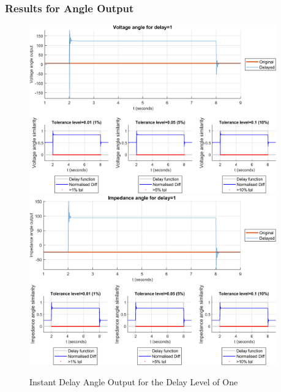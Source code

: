 \subsubsection{Results for Angle Output}
\begin{figure}
    \caption{Instant Delay Angle Output for the Delay Level of One}
    \includegraphics[width=0.95\textwidth]{PMUsim-figures/DelayOf_1/Instant_vAngle.png}    
    \includegraphics[width=0.95\textwidth]{PMUsim-figures/DelayOf_1/Instant_iAngle.png}    
        \begin{small}
     \end{small}
    \label{fig:PMUsim_One_Angle}
\end{figure}

